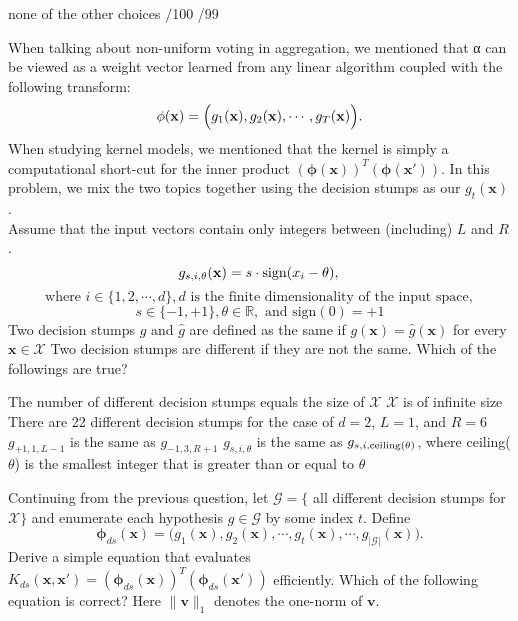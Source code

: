 \documentclass[a4paper,10pt]{exam}
\begin{document}
\begin{questions}
\begin{checkboxes}
	\choice none of the other choices
	/100
	/99
	\\	
\end{checkboxes}

\question When talking about non-uniform voting in aggregation, we mentioned that α can be viewed as a weight vector learned from any linear algorithm coupled with the following transform:
\[\mathbf{\phi}(\mathbf{x}) = \Bigl(g_1(\mathbf{x}), g_2(\mathbf{x}), \cdots, g_T(\mathbf{x})\Bigr).\]
When studying kernel models, we mentioned that the kernel is simply a computational short-cut for the inner product $(\mathbf{\phi}(\mathbf{x}))^T (\mathbf{\phi}(\mathbf{x}'))$. In this problem, we mix the two topics together using the decision stumps as our $g_t(\mathbf{x})$.\\
Assume that the input vectors contain only integers between (including) $L$ and $R$.
\[{g_{s,i,\theta }}({\bf{x}}) = s \cdot {\rm{sign}}({x_i} - \theta ),{\rm{ }}\]
\[{\mbox{where }}i \in \{ 1,2, \cdots ,d\} ,d{\mbox{ is the finite  dimensionality of the input space}},\]
\[s \in \{  - 1, + 1\} ,\theta  \in \mathbb{R} ,{\mbox{ and sign}}(0) =  + 1\]
Two decision stumps $g$ and $\hat{g}$ are defined as the same if $g(\mathbf{x}) = \hat{g}(\mathbf{x})$ for every $\mathbf{x} \in \mathcal{X}$ Two decision stumps are different if they are not the same. Which of the followings are true?\\
\begin{checkboxes}
	\choice The number of different decision stumps equals the size of $\mathcal{X}$
	\choice $\mathcal{X}$ is of infinite size
	\CorrectChoice There are 22 different decision stumps for the case of $d=2$, $L=1$, and $R=6$
	\CorrectChoice $g_{+1, 1, L-1}$ is the same as $g_{-1, 3, R+1}$
	\CorrectChoice $g_{s, i, \theta}$ is the same as $g_{s, i, \rm{ceiling}(\theta)}$, where ceiling($\theta$) is the smallest integer that is greater than or equal to $\theta$
\end{checkboxes}

\question Continuing from the previous question, let $\mathcal{G} = \{$ all different decision stumps for $\mathcal{X} \}$ and enumerate each hypothesis $g \in \mathcal{G}$ by some index $t$. Define
\[\mathbf{\phi}_{ds}(\mathbf{x}) = \Biggl(g_1(\mathbf{x}), g_2(\mathbf{x}), \cdots, g_t(\mathbf{x}), \cdots, g_{|\mathcal{G}|}(\mathbf{x})\Biggr).\]
Derive a simple equation that evaluates $K_{ds}(\mathbf{x}, \mathbf{x}') = (\mathbf{\phi}_{ds}(\mathbf{x}))^T (\mathbf{\phi}_{ds}(\mathbf{x}'))$ efficiently. Which of the following equation is correct? Here $\|\mathbf{v}\|_1$ denotes the one-norm of $\mathbf{v}$.


\end{questions}
\end{document}
